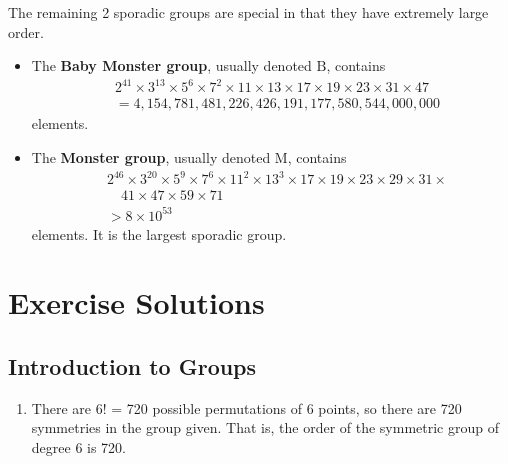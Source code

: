 The remaining 2 sporadic groups are special in that they have extremely large order.
\begin{itemize}
    \item The \textbf{Baby Monster group}, usually denoted $\mathrm{B}$, contains
    \begin{align*}
        &2^{41} \times 3^{13} \times 5^6 \times 7^2 \times 11 \times 13 \times 17 \times 19 \times 23 \times 31 \times 47\\
        &= 4,154,781,481,226,426,191,177,580,544,000,000
    \end{align*}
    elements.
    \item The \textbf{Monster group}, usually denoted $\mathrm{M}$, contains
    \begin{align*}
        &2^{46} \times 3^{20} \times 5^9 \times 7^6 \times 11^{2} \times 13^3 \times 17 \times 19 \times 23 \times 29 \times 31 \times \\
        &\quad 41 \times 47 \times 59 \times 71\\
        &> 8 \times 10^{53}
    \end{align*}
    elements. It is the largest sporadic group.
\end{itemize}

\appendix
\chapter{Exercise Solutions}

\section{Introduction to Groups}
\begin{enumerate}
    \item There are 6! = 720 possible permutations of 6 points, so there are 720 symmetries in the group given. That is, the order of the symmetric group of degree 6 is 720.
\end{enumerate}

